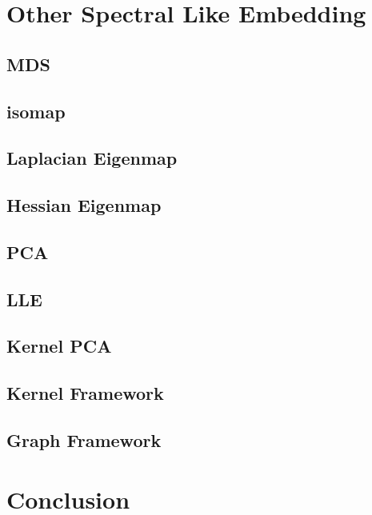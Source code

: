 \section{Other Spectral Like Embedding}
\label{sec:nldr}

\subsection{MDS}

\subsection{isomap}

\subsection{Laplacian Eigenmap}

\subsection{Hessian Eigenmap}

\subsection{PCA}

\subsection{LLE}

\subsection{Kernel PCA}

\subsection{Kernel Framework}

\subsection{Graph Framework}


\section{Conclusion}
\label{sec:conclusion}



